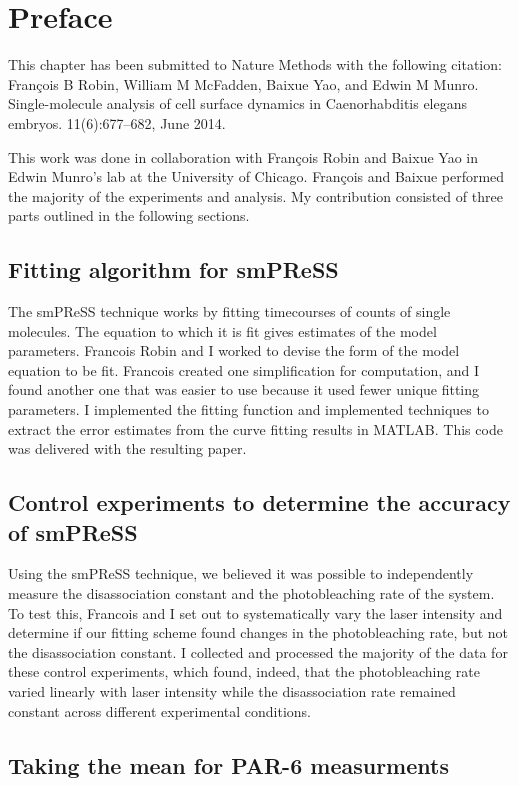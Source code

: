 \section{Preface}
This chapter has been submitted to Nature Methods with the following citation: François B Robin, William M McFadden, Baixue Yao, and Edwin M Munro. Single-molecule analysis of cell surface dynamics in Caenorhabditis elegans embryos. 11(6):677–682, June 2014.

This work was done in collaboration with Fran\c{c}ois Robin and Baixue Yao in Edwin Munro's lab at the University of Chicago.  Fran\c{c}ois and Baixue performed the majority of the experiments and analysis.  My contribution consisted of three parts outlined in the following sections.

\subsection{Fitting algorithm for smPReSS}

The smPReSS technique works by fitting timecourses of counts of single molecules.  The equation to which it is fit gives estimates of the model parameters.  Francois Robin and I worked to devise the form of the model equation to be fit. Francois created one simplification for computation, and I found another one that was easier to use because it used fewer unique fitting parameters.  I implemented the fitting function and implemented techniques to extract the error estimates from the curve fitting results in MATLAB.  This code was delivered with the resulting paper.

\subsection{Control experiments to determine the accuracy of smPReSS}

Using the smPReSS technique, we believed it was possible to independently measure the disassociation constant and the photobleaching rate of the system.  To test this, Francois and I set out to systematically vary the laser intensity and determine if our fitting scheme found changes in the photobleaching rate, but not the disassociation constant.  I collected and processed the majority of the data for these control experiments, which found, indeed, that the photobleaching rate varied linearly with laser intensity while the disassociation rate remained constant across different experimental conditions.

\subsection{Taking the mean for PAR-6 measurments}

